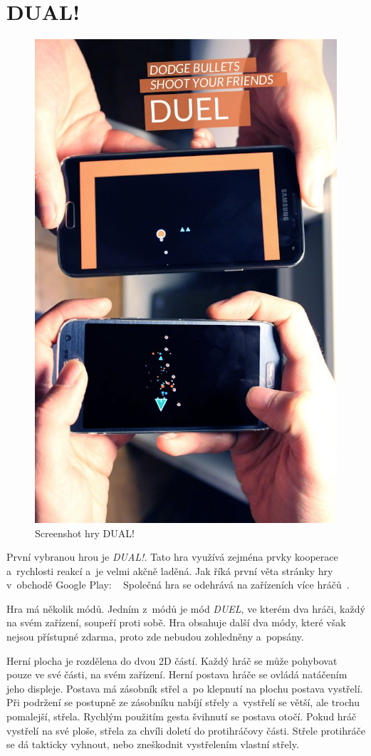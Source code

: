 \section{DUAL!}

\begin{figure}
    \centering
    \includegraphics[width=0.5\linewidth]{assets/competitive-apps/dual.jpg}
    \caption{Screenshot hry DUAL!~\cite{seabaa_dual}}
    \label{fig:dual}
\end{figure}

První vybranou hrou je \emph{DUAL!}.
Tato hra využívá zejména prvky kooperace a~rychlosti reakcí
a~je velmi akčně laděná.
Jak říká první věta stránky hry v~obchodě Google Play:
\emph{}~\cite{seabaa_dual}
Společná hra se odehrává na zařízeních více hráčů~\cite{seabaa_dual}.

Hra má několik módů.
Jedním z~módů je mód \emph{DUEL}, ve kterém dva hráči,
každý na svém zařízení,
soupeří proti sobě.
Hra obsahuje další dva módy, které však nejsou přístupné zdarma,
proto zde nebudou zohledněny a~popsány.

Herní plocha je rozdělena do dvou 2D částí.
Každý hráč se může pohybovat pouze ve své části, na svém zařízení.
Herní postava hráče se ovládá natáčením jeho displeje.
Postava má zásobník střel a~po klepnutí na plochu postava vystřelí.
Při podržení se postupně ze zásobníku nabíjí střely
a~vystřelí se větší, ale trochu pomalejší, střela.
Rychlým použitím gesta švihnutí se postava otočí.
Pokud hráč vystřelí na své ploše,
střela za chvíli doletí do protihráčovy části.
Střele protihráče se dá takticky vyhnout,
nebo zneškodnit vystřelením vlastní střely.

